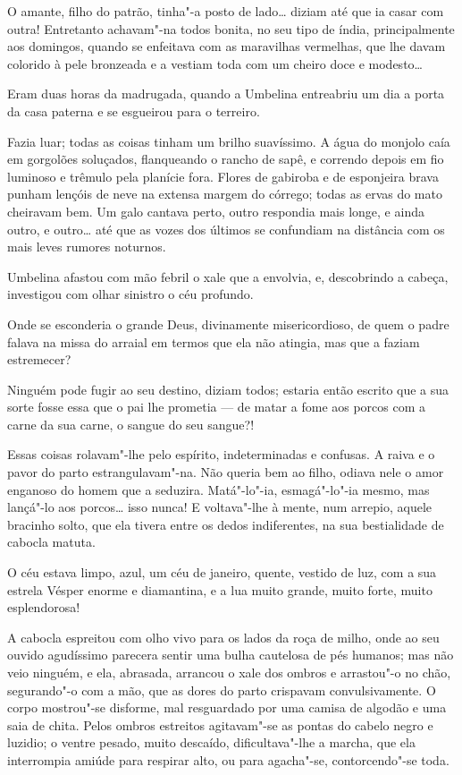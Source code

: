 O amante, filho do patrão, tinha"-a posto de lado\ldots{} diziam até que ia
casar com outra! Entretanto achavam"-na todos bonita, no seu tipo de
índia, principalmente aos domingos, quando se enfeitava com as
maravilhas vermelhas, que lhe davam colorido à pele bronzeada e a
vestiam toda com um cheiro doce e modesto\ldots{}

Eram duas horas da madrugada, quando a Umbelina entreabriu um dia a
porta da casa paterna e se esgueirou para o terreiro.

Fazia luar; todas as coisas tinham um brilho suavíssimo. A água do
monjolo caía em gorgolões soluçados, flanqueando o rancho de sapê, e
correndo depois em fio luminoso e trêmulo pela planície fora. Flores de
gabiroba e de esponjeira brava punham lençóis de neve na extensa margem
do córrego; todas as ervas do mato cheiravam bem. Um galo cantava perto,
outro respondia mais longe, e ainda outro, e outro\ldots{} até que as vozes
dos últimos se confundiam na distância com os mais leves rumores
noturnos.

Umbelina afastou com mão febril o xale que a envolvia, e, descobrindo a
cabeça, investigou com olhar sinistro o céu profundo.

Onde se esconderia o grande Deus, divinamente misericordioso, de quem o
padre falava na missa do arraial em termos que ela não atingia, mas que
a faziam estremecer?

Ninguém pode fugir ao seu destino, diziam todos; estaria então escrito
que a sua sorte fosse essa que o pai lhe prometia --- de matar a fome
aos porcos com a carne da sua carne, o sangue do seu sangue?!

Essas coisas rolavam"-lhe pelo espírito, indeterminadas e confusas. A
raiva e o pavor do parto estrangulavam"-na. Não queria bem ao filho,
odiava nele o amor enganoso do homem que a seduzira. Matá"-lo"-ia,
esmagá"-lo"-ia mesmo, mas lançá"-lo aos porcos\ldots{} isso nunca! E voltava"-lhe
à mente, num arrepio, aquele bracinho solto, que ela tivera entre os
dedos indiferentes, na sua bestialidade de cabocla matuta.

O céu estava limpo, azul, um céu de janeiro, quente, vestido de luz, com
a sua estrela Vésper enorme e diamantina, e a lua muito grande, muito
forte, muito esplendorosa!

A cabocla espreitou com olho vivo para os lados da roça de milho, onde
ao seu ouvido agudíssimo parecera sentir uma bulha cautelosa de pés
humanos; mas não veio ninguém, e ela, abrasada, arrancou o xale dos
ombros e arrastou"-o no chão, segurando"-o com a mão, que as dores do
parto crispavam convulsivamente. O corpo mostrou"-se disforme, mal
resguardado por uma camisa de algodão e uma saia de chita. Pelos ombros
estreitos agitavam"-se as pontas do cabelo negro e luzidio; o ventre
pesado, muito descaído, dificultava"-lhe a marcha, que ela interrompia
amiúde para respirar alto, ou para agacha"-se, contorcendo"-se toda.

